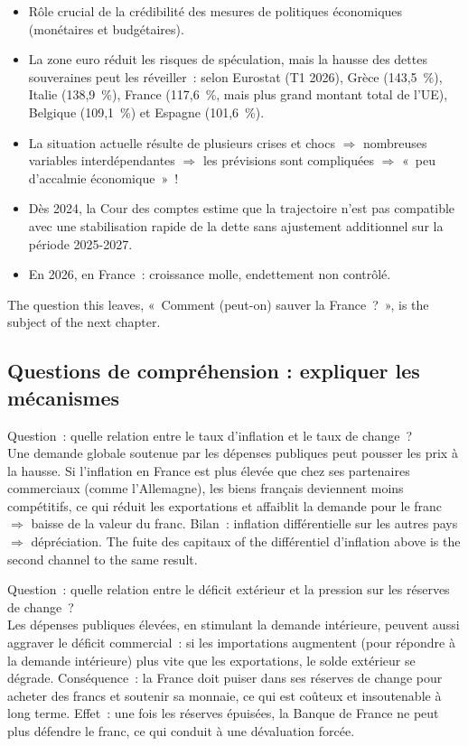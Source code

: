 \begin{itemize}
  \item Rôle crucial de la crédibilité des mesures de politiques économiques
    (monétaires et budgétaires).
  \item La zone euro réduit les risques de spéculation, mais la hausse des dettes
    souveraines peut les réveiller~: selon Eurostat (T1 2026), Grèce (143,5~\%), Italie
    (138,9~\%), France (117,6~\%, mais plus grand montant total de l'UE), Belgique
    (109,1~\%) et Espagne (101,6~\%).
  \item La situation actuelle résulte de plusieurs crises et chocs $\Rightarrow$
    nombreuses variables interdépendantes $\Rightarrow$ les prévisions sont compliquées
    $\Rightarrow$ «~peu d'accalmie économique~»~!
  \item Dès 2024, la Cour des comptes estime que la trajectoire n'est pas compatible
    avec une stabilisation rapide de la dette sans ajustement additionnel sur la
    période 2025-2027.
  \item En 2026, en France~: croissance molle, endettement non contrôlé.
\end{itemize}
The question this leaves, «~Comment (peut-on) sauver la France~?~», is the subject of
the next chapter.

\subsection{Questions de compréhension : expliquer les mécanismes}

\begin{example}
  Question~: quelle relation entre le taux d'inflation et le taux de change~?\\
  Une demande globale soutenue par les dépenses publiques peut pousser les prix à la
  hausse. Si l'inflation en France est plus élevée que chez ses partenaires commerciaux
  (comme l'Allemagne), les biens français deviennent moins compétitifs, ce qui réduit
  les exportations et affaiblit la demande pour le franc $\Rightarrow$ baisse de la
  valeur du franc. Bilan~: inflation différentielle sur les autres pays $\Rightarrow$
  dépréciation. The fuite des capitaux of the différentiel d'inflation above is the
  second channel to the same result.
\end{example}

\begin{example}
  Question~: quelle relation entre le déficit extérieur et la pression sur les réserves
  de change~?\\
  Les dépenses publiques élevées, en stimulant la demande intérieure, peuvent aussi
  aggraver le déficit commercial~: si les importations augmentent (pour répondre à la
  demande intérieure) plus vite que les exportations, le solde extérieur se dégrade.
  Conséquence~: la France doit puiser dans ses réserves de change pour acheter des
  francs et soutenir sa monnaie, ce qui est coûteux et insoutenable à long terme.
  Effet~: une fois les réserves épuisées, la Banque de France ne peut plus défendre le
  franc, ce qui conduit à une dévaluation forcée.
\end{example}

